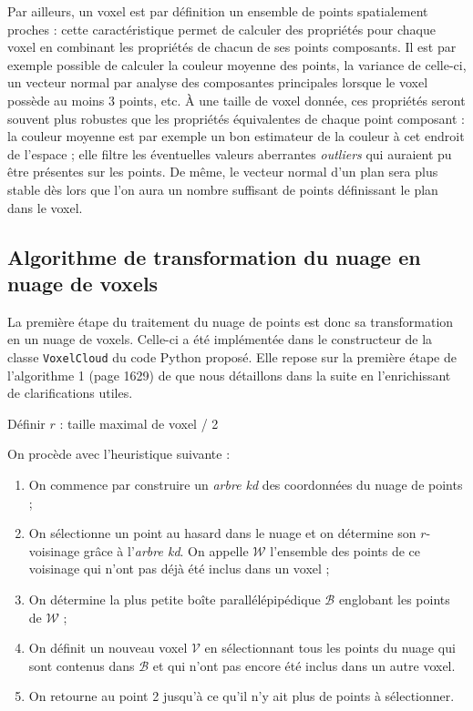 \documentclass[a4paper, onecolumn, 11pt]{article}
\newcommand{\TODO}{\fbox{\textcolor{red}{TODO}}}
\newcommand{\V}{\mathcal{V}}
\begin{document}
Par ailleurs, un voxel est par définition un ensemble de points spatialement proches : cette caractéristique permet de calculer des propriétés pour chaque voxel en combinant les propriétés de chacun de ses points composants. Il est par exemple possible de calculer la couleur moyenne des points, la variance de celle-ci, un vecteur normal par analyse des composantes principales lorsque le voxel possède au moins 3 points, etc. À une taille de voxel donnée, ces propriétés seront souvent plus robustes que les propriétés équivalentes de chaque point composant : la couleur moyenne est par exemple un bon estimateur de la couleur à cet endroit de l'espace ; elle filtre les éventuelles valeurs aberrantes \emph{outliers} qui auraient pu être présentes sur les points. De même, le vecteur normal d'un plan sera plus stable dès lors que l'on aura un nombre suffisant de points définissant le plan dans le voxel.

\subsection{Algorithme de transformation du nuage en nuage de voxels}
\label{partie-algo-voxels}
La première étape du traitement du nuage de points est donc sa transformation en un nuage de voxels. Celle-ci a été implémentée dans le constructeur de la classe \texttt{VoxelCloud} du code Python proposé. Elle repose sur la première étape de l'algorithme 1 (page 1629) de \cite{aka_article} que nous détaillons dans la suite en l'enrichissant de clarifications utiles.

\TODO Définir $r$ : taille maximal de voxel / 2

On procède avec l'heuristique suivante :
\begin{enumerate}
	\item On commence par construire un \emph{arbre kd} des coordonnées du nuage de points ;
	\item On sélectionne un point au hasard dans le nuage et on détermine son $r$-voisinage grâce à l'\emph{arbre kd}. On appelle $\mathcal{W}$ l'ensemble des points de ce voisinage qui n'ont pas déjà été inclus dans un voxel ;
	\item On détermine la plus petite boîte parallélépipédique $\mathcal{B}$ englobant les points de $\mathcal{W}$ ;
	\item On définit un nouveau voxel $\V$ en sélectionnant tous les points du nuage qui sont contenus dans $\mathcal{B}$ et qui n'ont pas encore été inclus dans un autre voxel.
	\item On retourne au point 2 jusqu'à ce qu'il n'y ait plus de points à sélectionner.
\end{enumerate}
\end{document}
